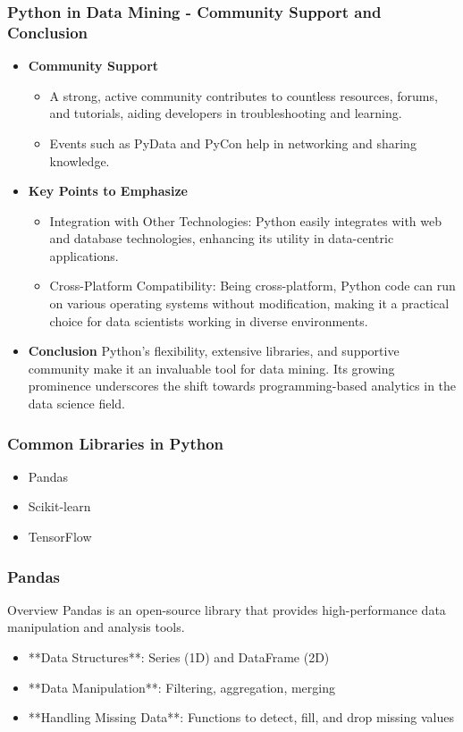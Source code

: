 \documentclass[aspectratio=169]{beamer}
\begin{document}
\begin{frame}[fragile]
    \frametitle{Python in Data Mining - Community Support and Conclusion}
    \begin{itemize}
        \item \textbf{Community Support}
        \begin{itemize}
            \item A strong, active community contributes to countless resources, forums, and tutorials, aiding developers in troubleshooting and learning.
            \item Events such as PyData and PyCon help in networking and sharing knowledge.
        \end{itemize}

        \item \textbf{Key Points to Emphasize}
        \begin{itemize}
            \item Integration with Other Technologies: Python easily integrates with web and database technologies, enhancing its utility in data-centric applications.
            \item Cross-Platform Compatibility: Being cross-platform, Python code can run on various operating systems without modification, making it a practical choice for data scientists working in diverse environments.
        \end{itemize}

        \item \textbf{Conclusion}
        Python's flexibility, extensive libraries, and supportive community make it an invaluable tool for data mining. 
        Its growing prominence underscores the shift towards programming-based analytics in the data science field.
    \end{itemize}
\end{frame}

\begin{frame}
    \frametitle{Common Libraries in Python}
    \begin{itemize}
        \item Pandas
        \item Scikit-learn
        \item TensorFlow
    \end{itemize}
\end{frame}

\begin{frame}
    \frametitle{Pandas}
    \begin{block}{Overview}
        Pandas is an open-source library that provides high-performance data manipulation and analysis tools.
    \end{block}
    
    \begin{itemize}
        \item **Data Structures**: Series (1D) and DataFrame (2D)
        \item **Data Manipulation**: Filtering, aggregation, merging
        \item **Handling Missing Data**: Functions to detect, fill, and drop missing values
    \end{itemize}
\end{frame}
\end{document}
